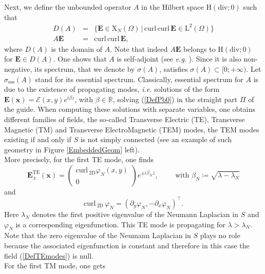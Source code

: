 \documentclass[11pt,a4paper]{article}
\newcommand{\Om}{\Omega}
\newcommand{\mrm}[1]{\mathrm{#1}}
\newcommand{\bfx}{\boldsymbol{x}}
\newcommand{\R}{\mathbb{R}}
\newcommand{\mL}{\mrm{L}}
\newcommand{\mH}{\mrm{H}}
\newcommand{\mX}{\mrm{X}}
\newcommand{\curlvec}{\boldsymbol{\mrm{curl}}\,}
\renewcommand{\div}{\mrm{div}}
\def\E{\boldsymbol{E}}
\begin{document}
Next, we define the unbounded operator $A$ in the Hilbert space $\boldsymbol{\mH}(\div;0)$ such that 
\begin{equation}\label{DefOpA}
\begin{array}{|rcl}
D(A)&=&\{\E\in\boldsymbol{\mX}_N(\Om)\,|\,\curlvec\curlvec\E\in\boldsymbol{\mL}^2(\Om)\}\\[4pt]
A\E&=&\curlvec\curlvec\E,
\end{array}
\end{equation}
where $D(A)$ is the domain of $A$. Note that indeed $A\E$ belongs to $\boldsymbol{\mH}(\div;0)$ for $\E\in D(A)$. One shows that $A$ is self-adjoint (see \textit{e.g.} \cite{BiSo87b}). Since it is also non-negative, its spectrum, that we denote by $\sigma(A)$, satisfies $\sigma(A)\subset[0;+\infty)$. Let $\sigma_{\mrm{ess}}(A)$ stand for its essential spectrum. Classically, essential spectrum for $A$ is due to the existence of propagating modes, \textit{i.e.} solutions of the form $\E(\bfx)=\mathscr{E}(x,y)e^{i\beta z}$, with $\beta\in\R$, solving (\ref{DefPb0}) in the straight part $\Pi$ of the guide. When computing these solutions with separate variables, one obtains different families of fields, the so-called Transverse Electric (TE), Transverse Magnetic (TM) and Transverse ElectroMagnetic (TEM) modes, the TEM modes existing if and only if $S$ is not simply connected (see an example of such geometry in Figure \ref{EmbeddedGeom} left).\\ 
\newline
More precisely, for the first TE mode, one finds
\begin{equation}\label{DefTEmodes}
\E^{\mrm{TE}}_\pm(\bfx)=\left(\begin{array}{c}\curlvec_{\mrm{2D}} \varphi_N(x,y)\\0\end{array}\right)e^{\pm i\beta_{N} z},\qquad\mbox{ with }\beta_{N}\coloneqq\sqrt{\lambda-\lambda_N}
\end{equation}
and
\[
\curlvec_{\mrm{2D}}\,\varphi_N=(\partial_y\varphi_N,-\partial_x\varphi_N)^{\top}.
\]
Here $\lambda_N$ denotes the first positive eigenvalue of the Neumann Laplacian in $S$ and $\varphi_N$ is a corresponding eigenfunction. This TE mode is propagating for $\lambda>\lambda_N$. Note that the zero eigenvalue of the Neumann Laplacian in $S$ plays no role because the associated eigenfunction is constant and therefore in this case the field (\ref{DefTEmodes}) is null.\\
\newline
For the first TM mode, one gets
\end{document}
